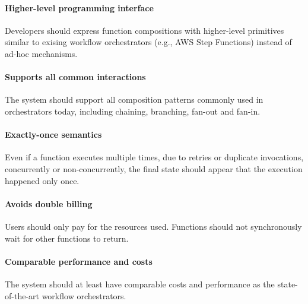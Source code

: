 \paragraph{Higher-level programming interface} Developers should express
function compositions with higher-level primitives similar to exising workflow
orchestrators (e.g., AWS Step Functions) instead of ad-hoc mechanisms.

\paragraph{Supports all common interactions} The system should support all
composition patterns commonly used in orchestrators today, including chaining,
branching, fan-out and fan-in.

\paragraph{Exactly-once semantics} Even if a function executes multiple times,
due to retries or duplicate invocations, concurrently or non-concurrently, the
final state should appear that the execution happened only once.

\paragraph{Avoids double billing} Users should only pay for the resources
used. Functions should not synchronously wait for other functions to return.

\paragraph{Comparable performance and costs} The system should at least have
comparable costs and performance as the state-of-the-art workflow
orchestrators.
